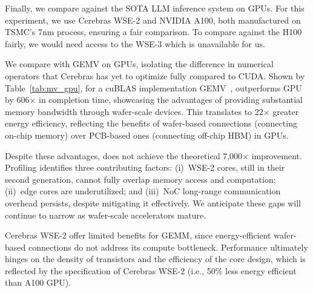 \begin{table}[t]
  \centering
  \caption{Comparing MeshGEMM(WSE-2) with cuBLAS(A100) in GEMM latency and energy.}
  \label{tab:mm_gpu}%
\end{table}%

Finally, we compare \sys against the SOTA LLM inference system on GPUs. For this experiment, we use Cerebras WSE-2 and NVIDIA A100, both manufactured on TSMC’s 7nm process, ensuring a fair comparison. To compare against the H100 fairly, we would need access to the WSE-3 which is unavailable for us.

 We compare \gemv with GEMV on GPUs, isolating the difference in numerical operators that Cerebras has yet to optimize fully compared to CUDA. Shown by Table~\ref{tab:mv_gpu}, for a cuBLAS implementation GEMV~\cite{nvidia_cublas}, \gemv outperforms GPU by 606$\times$ in completion time, showcasing the advantages of providing substantial memory bandwidth through wafer-scale devices. This translates to 22$\times$ greater energy efficiency, reflecting the benefits of wafer-based connections (connecting on-chip memory) over PCB-based ones (connecting off-chip HBM) in GPUs.

Despite these advantages, \gemv does not achieve the theoretical 7,000$\times$ improvement. Profiling identifies three contributing factors: (i)~WSE-2 cores, still in their second generation, cannot fully overlap memory access and computation; (ii)~edge cores are underutilized; and (iii)~NoC long-range communication overhead persists, despite \gemv mitigating it effectively. We anticipate these gaps will continue to narrow as wafer-scale accelerators mature.

 Cerebras WSE-2 offer limited benefits for GEMM, since energy-efficient wafer-based connections do not address its compute bottleneck. Performance ultimately hinges on the density of transistors and the efficiency of the core design, which is reflected by the specification of Cerebras WSE-2 (i.e., 50\% less energy efficient than A100 GPU). 

